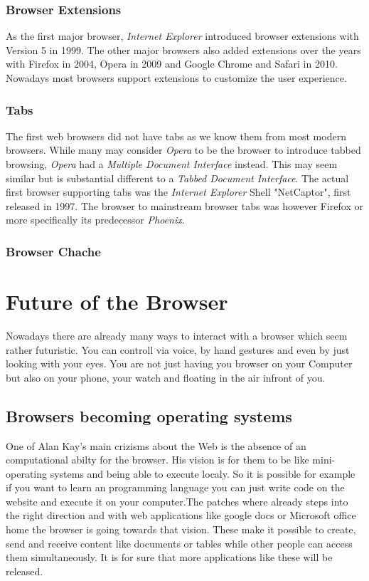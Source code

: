 \documentclass[runningheads]{llncs}
\begin{document}
			\subsubsection{Browser Extensions}
			As the first major browser, \textit{Internet Explorer} introduced browser extensions with Version 5 in 1999. The other major browsers also added extensions over the years with Firefox in 2004, Opera in 2009 and Google Chrome and Safari in 2010. Nowadays most browsers support extensions to customize the user experience.
			\subsubsection{Tabs}
			The first web browsers did not have tabs as we know them from most modern browsers. While many may consider \textit{Opera} to be the browser to introduce tabbed browsing, \textit{Opera} had a  \textit{Multiple Document Interface} instead. This may seem similar but is substantial different to a \textit{Tabbed Document Interface}. The actual first browser supporting tabs was the \textit{Internet Explorer} Shell "NetCaptor", first released in 1997. The browser to mainstream browser tabs was however Firefox or more specifically its predecessor \textit{Phoenix}.
			\subsubsection{Browser Chache}

	\section{Future of the Browser}
	Nowadays there are already many ways to interact with a browser which seem rather futuristic. You can controll via voice, by hand gestures and even by just looking with your eyes. You are not just having you browser on your Computer but also on your phone, your watch and floating in the air infront of you.
		\subsection{Browsers becoming operating systems}
		One of Alan Kay's main crizisms about the Web is the absence of an computational abilty for the browser. His vision is for them to be like  mini-operating systems and being able to execute localy. So it is possible for example if you want to learn an programming language you can just write code on the website and execute it on your computer.The patches where already steps into the right direction and with web applications like google docs or Microsoft office home the browser is going towards that vision. These make it possible to create, send and receive content like documents or tables while other people can access them simultaneously. It is for sure that more applications like these will be released.
\end{document}
